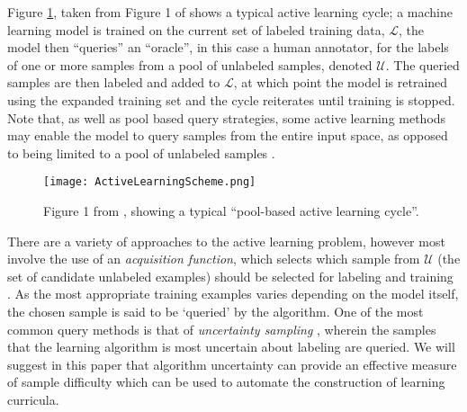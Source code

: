 Figure \ref{ActiveLearningExample}, taken from Figure 1 of \cite{settles2012active} shows a typical active learning cycle; a machine learning model is trained on the current set of labeled training data, $\mathcal{L}$, the model then ``queries'' an ``oracle'', in this case a human annotator, for the labels of one or more samples from a pool of unlabeled  samples, denoted $\mathcal{U}$. The queried samples are then labeled and added to $\mathcal{L}$, at which point the model is retrained using the expanded training set and the cycle reiterates until training is stopped. Note that, as well as pool based query strategies, some active learning methods may enable the model to query samples from the entire input space, as opposed to being limited to a pool of unlabeled samples \cite{settles2012active}.

\begin{figure}[h!]
\centering
\texttt{[image: ActiveLearningScheme.png]}
\caption{Figure 1 from  \cite{settles2012active}, showing a typical ``pool-based active learning cycle''.}
\label{ActiveLearningExample}
\end{figure}

There are a variety of approaches to the active learning problem, however most involve the use of an \textit{acquisition function}, which selects which sample from $\mathcal{U}$ (the set of candidate unlabeled examples) should be selected for labeling and training \cite{settles2012active}. As the most appropriate training examples varies depending on the model itself, the chosen sample is said to be `queried' by the algorithm. One of the most common query methods is that of \textit{uncertainty sampling} \cite{settles2012active}, wherein the samples that the learning algorithm is most uncertain about labeling are queried. We will suggest in this paper that algorithm uncertainty can provide an effective measure of sample difficulty which can be used to automate the construction of learning curricula.

